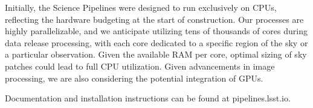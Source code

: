 Initially, the Science Pipelines were designed to run exclusively on CPUs, reflecting the hardware budgeting at the start of construction. Our processes are highly parallelizable, and we anticipate utilizing tens of thousands of cores during data release processing, with each core dedicated to a specific region of the sky or a particular observation. Given the available RAM per core, optimal sizing of sky patches could lead to full CPU utilization. Given advancements in image processing, we are also considering the potential integration of GPUs.

Documentation and installation instructions can be found at pipelines.lsst.io.
